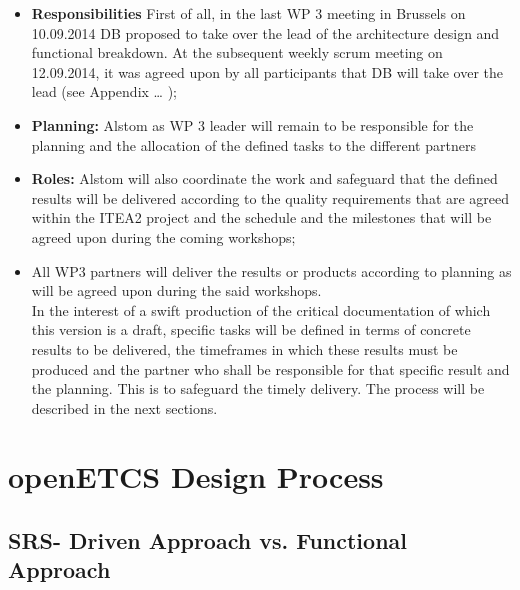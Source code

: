 \begin{itemize}
\item\textbf{Responsibilities} First of all, in the last WP 3 meeting in Brussels on  10.09.2014 DB proposed to take over the lead of the architecture design and functional breakdown. At the subsequent weekly scrum meeting on 12.09.2014,  it was agreed upon by all participants that DB will take over the lead (see Appendix … );\\
\item\textbf{Planning:} Alstom as WP 3 leader will remain to be responsible for the planning and the allocation of the defined tasks to the different partners\\
\item\textbf{Roles:} Alstom will also coordinate the work and safeguard that the defined results will be delivered according to the quality requirements that are agreed within the ITEA2 project and the schedule and the milestones that will be agreed upon during the coming workshops;\\
\item All WP3 partners will deliver the results or products according to planning as will be agreed upon during the said workshops. \\

In the interest of a swift production of the critical documentation of which this version is a draft, specific tasks will be defined in terms of concrete results to be delivered, the timeframes in which these results must be produced and the partner who shall be responsible for that specific result and the planning. This is to safeguard the timely delivery. The process will be described in the next sections.\\
\end{itemize}






\section{openETCS Design Process}


\subsection{SRS- Driven Approach vs. Functional Approach}

